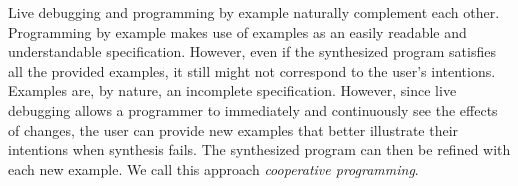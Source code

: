 Live debugging and programming by example naturally complement each other.
Programming by example makes use of examples as an easily readable and understandable specification. However, even if the synthesized program satisfies all the provided examples, it still might not correspond to the user's intentions. Examples are, by nature, an incomplete specification. However, since live debugging allows a programmer to immediately and continuously see the effects of changes, the user can provide new examples that better illustrate their intentions when synthesis fails. The synthesized program can then be refined with each new example. We call this approach {\emph{cooperative programming}}.






